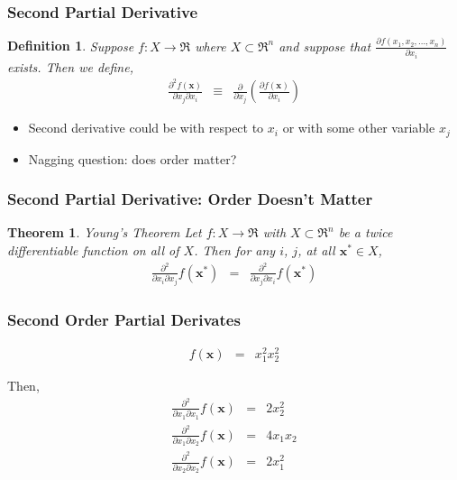 \documentclass{beamer}
\newtheorem{thm}{Theorem}
\newtheorem{defn}{Definition}
\numberwithin{equation}{section}
\begin{document}
\begin{frame}
\frametitle{Second Partial Derivative}

\begin{defn}
Suppose $f:X \rightarrow \Re$ where $X \subset \Re^{n}$ and suppose that $\frac{\partial f(x_{1}, x_{2}, \hdots, x_{n})}{\partial x_{i} }$ exists.  Then we define, 
\begin{eqnarray}
\frac{ \partial^{2}  f(\boldsymbol{x}) }{\partial x_{j} \partial x_{i} } & \equiv & \frac{\partial}{\partial x_{j} } \left( \frac{\partial f(\boldsymbol{x})  }{\partial x_{i} }  \right) \nonumber 
\end{eqnarray}

\end{defn}

\begin{itemize}
\item[-] Second derivative could be with respect to $x_{i}$ or with some other variable $x_{j}$
\item[-] Nagging question: does order matter?
\end{itemize}


\end{frame}

\begin{frame}
\frametitle{Second Partial Derivative: Order Doesn't Matter} 

\begin{thm} 
Young's Theorem Let $f: X \rightarrow \Re$ with $X \subset \Re^{n}$ be a twice differentiable function on all of $X$.  Then for any $i$, $j$, at all $\boldsymbol{x}^{*} \in X$, 
\begin{eqnarray}
\frac{\partial^{2} } {\partial x_{i} \partial x_{j} }f(\boldsymbol{x}^{*} ) & = &   \frac{\partial^{2} } {\partial x_{j} \partial x_{i} }f(\boldsymbol{x}^{*} ) \nonumber 
\end{eqnarray}

\end{thm}


\end{frame}

\begin{frame}
\frametitle{Second Order Partial Derivates} 

\begin{eqnarray}
f(\boldsymbol{x}) & = & x_{1}^2 x_{2}^2 \nonumber 
\end{eqnarray}

Then, 
\begin{eqnarray}
\frac{\partial^2}{\partial x_{1} \partial x_{1} } f(\boldsymbol{x}) & = & 2 x_{2}^{2} \nonumber \\
\frac{\partial^2}{\partial x_{1} \partial x_{2} } f(\boldsymbol{x}) & = & 4 x_{1} x_{2} \nonumber \\
\frac{\partial^2}{\partial x_{2} \partial x_{2} } f(\boldsymbol{x}) & = & 2 x_{1}^{2} \nonumber 
\end{eqnarray}


\end{frame}
\end{document}
